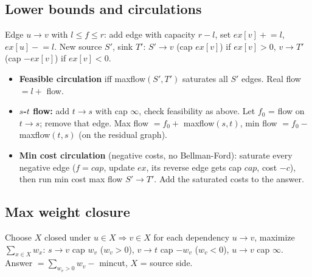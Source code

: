	\subsection{Lower bounds and circulations}
		Edge $u \to v$ with $l \le f \le r$: add edge with capacity $r - l$, set $ex[v] \mathrel{+}= l$, $ex[u] \mathrel{-}= l$.
		New source $S'$, sink $T'$: $S' \to v$ (cap $ex[v]$) if $ex[v] > 0$, $v \to T'$ (cap $-ex[v]$) if $ex[v] < 0$.
		\begin{itemize}[noitemsep]
			\item \textbf{Feasible circulation} iff maxflow$(S',T')$ saturates all $S'$ edges. Real flow $= l +$ flow.
			\item \textbf{$s$-$t$ flow:} add $t \to s$ with cap $\infty$, check feasibility as above. Let $f_0$ = flow on $t \to s$; remove that edge.
			Max flow $= f_0 + $ maxflow$(s,t)$, min flow $= f_0 - $ maxflow$(t,s)$ (on the residual graph).
			\item \textbf{Min cost circulation} (negative costs, no Bellman-Ford): saturate every negative edge ($f = cap$, update $ex$, its reverse edge gets cap $cap$, cost $-c$), then run min cost max flow $S' \to T'$. Add the saturated costs to the answer.
		\end{itemize}

	\subsection{Max weight closure}
		Choose $X$ closed under $u \in X \Rightarrow v \in X$ for each dependency $u \to v$, maximize $\sum_{x \in X} w_x$:
		$s \to v$ cap $w_v$ ($w_v > 0$), $v \to t$ cap $-w_v$ ($w_v < 0$), $u \to v$ cap $\infty$.
		Answer $= \sum_{w_v > 0} w_v - $ mincut, $X$ = source side.
